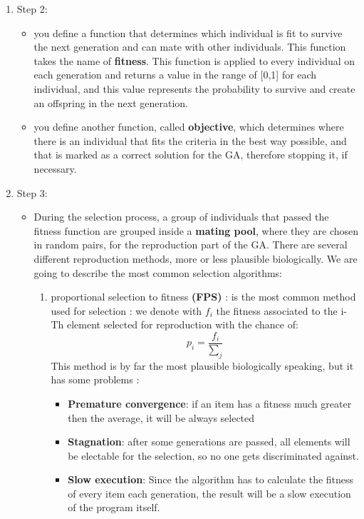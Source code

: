 \documentclass{article}
\begin{document}
\begin{enumerate}
    \item Step 2: \newline
        \begin{itemize}
            \item you define a function that determines which individual is fit to survive the next generation and can mate with other individuals. This function takes the name of \textbf{fitness}. This function is applied to every individual on each generation and returns a value in the range of [0,1] for each individual, and this value represents the probability to survive and create an offspring in the next generation.
            \item you define another function, called \textbf{objective}, which determines where there is an individual that fits the criteria in the best way possible, and that is marked as a correct solution for the GA, therefore stopping it, if necessary.
            \end{itemize}
    \item Step 3:
        \begin{itemize}
            \item During the selection process, a group of individuals that passed the fitness function are grouped inside a \textbf{mating pool}, where they are chosen in random pairs, for the reproduction part of the GA. There are several different reproduction methods, more or less plausible biologically. We are going to describe the most common selection algorithms:
                \begin{enumerate}
                    \item  proportional selection to fitness \textbf{(FPS)} : is the most common method used for selection : we denote with $f_i$ the fitness associated to the i-Th element
                    selected for reproduction with the chance of:
                    \[p_i= \frac{f_i}{\sum_{j}^{} } \]
                    This method is by far the most plausible biologically speaking,  but it has some problems :
                    \begin{itemize}
                        \item \textbf{Premature convergence}: if an item has a fitness much greater then the average, it will be always selected
                        \item \textbf{Stagnation}: after some generations are passed, all elements will be electable for the selection, so no one gets discriminated against.
                        \item \textbf{Slow execution}: Since the algorithm has to calculate the fitness of every item each generation, the result will be a slow execution of the program itself.

\end{itemize}
\end{enumerate}
\end{itemize}
\end{enumerate}
\end{document}
